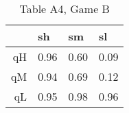 \begin{table}[ht]
\centering
\begin{tabular}{rlll}
  \hline
 & sh & sm & sl \\ 
  \hline
qH & 0.96 & 0.60 & 0.09 \\ 
  qM & 0.94 & 0.69 & 0.12 \\ 
  qL & 0.95 & 0.98 & 0.96 \\ 
   \hline
\end{tabular}
\caption{Table A4, Game B} 
\end{table}

